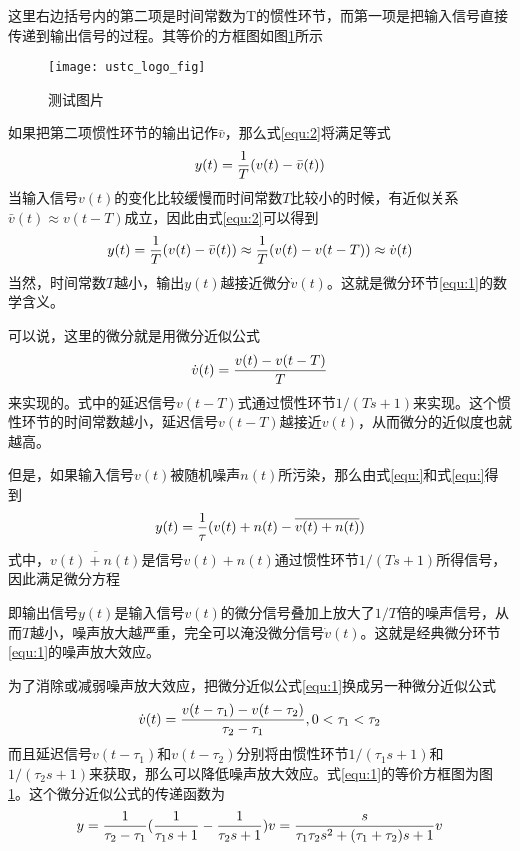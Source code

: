 这里右边括号内的第二项是时间常数为T的惯性环节，而第一项是把输入信号直接传递到输出信号的过程。其等价的方框图如图\ref{fig:td}所示
\begin{figure}[htbp]
\centering
\texttt{[image: ustc\_logo\_fig]}
\caption{测试图片}
\label{fig:td}
\end{figure}
如果把第二项惯性环节的输出记作${\bar v}$，那么式\ref{equ:2}将满足等式
\begin{equation}
\centering
\label{equ:2}
y(t) = \frac{1}{T}(v(t) - \bar v(t))
\end{equation}
当输入信号$v(t)$的变化比较缓慢而时间常数$T$比较小的时候，有近似关系$\bar v(t) \approx v(t - T)$成立，因此由式\ref{equ:2}可以得到
\begin{equation}
\centering
\label{equ:3}
y(t) = \frac{1}{T}(v(t) - \bar v(t)) \approx \frac{1}{T}(v(t) - v(t - T)) \approx \dot v(t)
\end{equation}
当然，时间常数$T$越小，输出$y(t)$越接近微分$\dot v(t)$。这就是微分环节\ref{equ:1}的数学含义。

可以说，这里的微分就是用微分近似公式
\begin{equation}
\centering
\label{}
\dot v(t) = \frac{{v(t) - v(t - T)}}{T}
\end{equation}
来实现的。式中的延迟信号$v(t-T)$式通过惯性环节$1/(Ts+1)$来实现。这个惯性环节的时间常数越小，延迟信号$v(t-T)$越接近$v(t)$，从而微分的近似度也就越高。

但是，如果输入信号$v(t)$被随机噪声$n(t)$所污染，那么由式\ref{equ:}和式\ref{equ:}得到
\begin{equation}
\centering
\label{}
y(t) = \frac{1}{\tau }(v(t) + n(t) - \overline {v(t) + n(t)} )
\end{equation}
式中，$\overline {v(t) + n(t)}$是信号$v(t)+n(t)$通过惯性环节$1/(Ts+1)$所得信号，因此满足微分方程


即输出信号$y(t)$是输入信号$v(t)$的微分信号叠加上放大了$1/T$倍的噪声信号，从而$T$越小，噪声放大越严重，完全可以淹没微分信号$\dot v(t)$。这就是经典微分环节\ref{equ:1}的噪声放大效应。

为了消除或减弱噪声放大效应，把微分近似公式\ref{equ:1}换成另一种微分近似公式
\begin{equation}
\centering
\label{}
\dot v(t) = \frac{{v(t - \tau_1) - v(t - \tau_2)}}{{\tau_2 - \tau_1}},0 < \tau_1 < \tau_2
\end{equation}
而且延迟信号${v(t - \tau_1)}$和${v(t - \tau_2)}$分别将由惯性环节$1/(\tau_1s + 1)$和$1/(\tau_2s + 1)$来获取，那么可以降低噪声放大效应。式\ref{equ:1}的等价方框图为图\ref{fig:td}。这个微分近似公式的传递函数为
\begin{equation}
\centering
\label{}
y = \frac{1}{{\tau_2 - \tau_1}}(\frac{1}{{\tau_1s + 1}} - \frac{1}{{\tau_2s + 1}})v = \frac{s}{{\tau_1\tau_2{s^2} + (\tau_1 + \tau_2)s + 1}}v
\end{equation}


